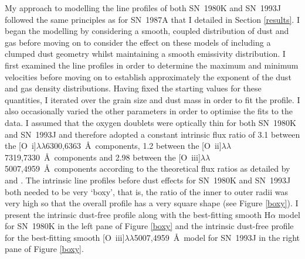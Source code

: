 My approach to modelling the line profiles of both SN~1980K and SN~1993J followed the same principles as for SN~1987A that I detailed in Section \ref{results}.  I began the modelling by considering a smooth, coupled distribution of dust and gas before moving on to consider the effect on these models of including a clumped dust geometry whilst maintaining a smooth emissivity distribution.  I first examined the line profiles in order to determine the maximum and minimum velocities before moving on to establish approximately the exponent of the dust and gas density distributions.  Having fixed the starting values for these quantities, I iterated over the grain size and dust mass in order to fit the profile.  I also occasionally  varied the other parameters in order to optimise the fits to the data. I assumed that the oxygen doublets were optically thin for both SN~1980K and SN~1993J and therefore adopted a constant intrinsic flux ratio of 3.1 between the [O~{\sc i}]$\lambda\lambda$6300,6363~\AA\  components, 1.2 between the [O~{\sc ii}]$\lambda\lambda$7319,7330~\AA\  components and 2.98 between the [O~{\sc iii}]$\lambda\lambda$5007,4959~\AA\  components according to the theoretical flux ratios as detailed by \citet{Zeippen1987} and \citet{Storey2000}.  The intrinsic line profiles before dust effects for SN~1980K and SN~1993J both needed to be very `boxy', that is, the ratio of the inner to outer radii was very high so that the overall profile has a very square shape (see Figure \ref{boxy}).  I present the intrinsic dust-free profile along with the best-fitting smooth H$\alpha$ model for SN~1980K in the left pane of Figure \ref{boxy} and the intrinsic dust-free profile for the best-fitting smooth [O~{\sc iii}]$\lambda\lambda$5007,4959~\AA\ model for SN~1993J in the right pane of Figure \ref{boxy}.

